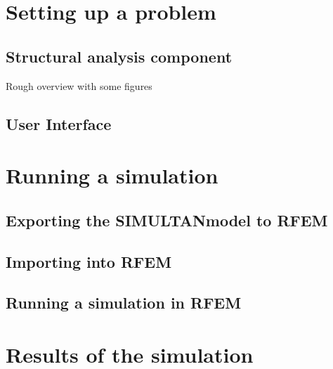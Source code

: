 \documentclass[letterpaper,10pt,english]{jupyterBook}
\begin{document}
\chapter{Setting up a problem}
\label{\detokenize{Setting_up_a_problem:setting-up-a-problem}}\label{\detokenize{Setting_up_a_problem:id1}}\label{\detokenize{Setting_up_a_problem::doc}}

\section{Structural analysis component}
\label{\detokenize{Setting_up_a_problem:structural-analysis-component}}
\sphinxAtStartPar
Rough overview with some figures


\section{User Interface}
\label{\detokenize{Setting_up_a_problem:user-interface}}
\sphinxstepscope


\chapter{Running a simulation}
\label{\detokenize{Running_a_simulation:running-a-simulation}}\label{\detokenize{Running_a_simulation:id1}}\label{\detokenize{Running_a_simulation::doc}}

\section{Exporting the SIMULTAN\sphinxhyphen{}model to RFEM}
\label{\detokenize{Running_a_simulation:exporting-the-simultan-model-to-rfem}}

\section{Importing into RFEM}
\label{\detokenize{Running_a_simulation:importing-into-rfem}}

\section{Running a simulation in RFEM}
\label{\detokenize{Running_a_simulation:running-a-simulation-in-rfem}}
\sphinxstepscope


\chapter{Results of the simulation}
\label{\detokenize{Results_of_the_simulation:results-of-the-simulation}}\label{\detokenize{Results_of_the_simulation:id1}}\label{\detokenize{Results_of_the_simulation::doc}}
\end{document}
